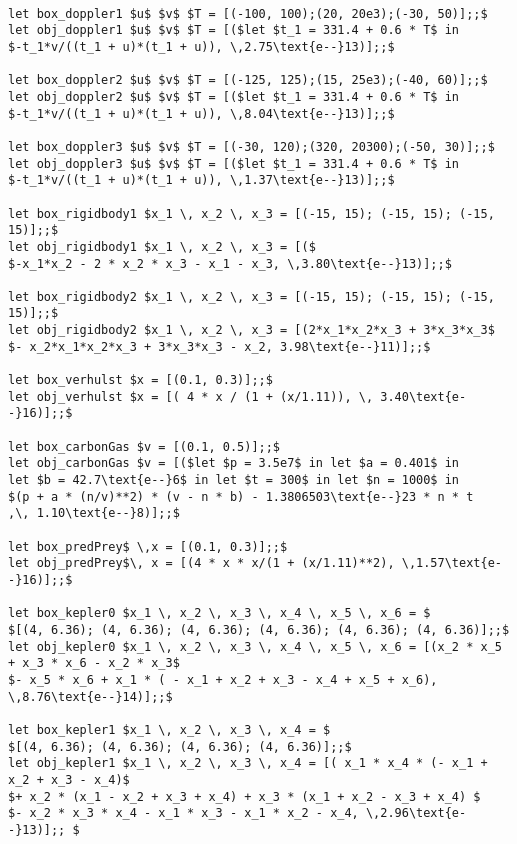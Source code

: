 {\scriptsize
\begin{lstlisting}

let box_doppler1 $u$ $v$ $T = [(-100, 100);(20, 20e3);(-30, 50)];;$ 
let obj_doppler1 $u$ $v$ $T = [($let $t_1 = 331.4 + 0.6 * T$ in 
$-t_1*v/((t_1 + u)*(t_1 + u)), \,2.75\text{e--}13)];;$

let box_doppler2 $u$ $v$ $T = [(-125, 125);(15, 25e3);(-40, 60)];;$ 
let obj_doppler2 $u$ $v$ $T = [($let $t_1 = 331.4 + 0.6 * T$ in 
$-t_1*v/((t_1 + u)*(t_1 + u)), \,8.04\text{e--}13)];;$

let box_doppler3 $u$ $v$ $T = [(-30, 120);(320, 20300);(-50, 30)];;$ 
let obj_doppler3 $u$ $v$ $T = [($let $t_1 = 331.4 + 0.6 * T$ in 
$-t_1*v/((t_1 + u)*(t_1 + u)), \,1.37\text{e--}13)];;$

let box_rigidbody1 $x_1 \, x_2 \, x_3 = [(-15, 15); (-15, 15); (-15, 15)];;$
let obj_rigidbody1 $x_1 \, x_2 \, x_3 = [($
$-x_1*x_2 - 2 * x_2 * x_3 - x_1 - x_3, \,3.80\text{e--}13)];;$

let box_rigidbody2 $x_1 \, x_2 \, x_3 = [(-15, 15); (-15, 15); (-15, 15)];;$
let obj_rigidbody2 $x_1 \, x_2 \, x_3 = [(2*x_1*x_2*x_3 + 3*x_3*x_3$ 
$- x_2*x_1*x_2*x_3 + 3*x_3*x_3 - x_2, 3.98\text{e--}11)];;$

let box_verhulst $x = [(0.1, 0.3)];;$
let obj_verhulst $x = [( 4 * x / (1 + (x/1.11)), \, 3.40\text{e--}16)];;$

let box_carbonGas $v = [(0.1, 0.5)];;$
let obj_carbonGas $v = [($let $p = 3.5e7$ in let $a = 0.401$ in 
let $b = 42.7\text{e--}6$ in let $t = 300$ in let $n = 1000$ in
$(p + a * (n/v)**2) * (v - n * b) - 1.3806503\text{e--}23 * n * t
,\, 1.10\text{e--}8)];;$

let box_predPrey$ \,x = [(0.1, 0.3)];;$
let obj_predPrey$\, x = [(4 * x * x/(1 + (x/1.11)**2), \,1.57\text{e--}16)];;$

let box_kepler0 $x_1 \, x_2 \, x_3 \, x_4 \, x_5 \, x_6 = $
$[(4, 6.36); (4, 6.36); (4, 6.36); (4, 6.36); (4, 6.36); (4, 6.36)];;$
let obj_kepler0 $x_1 \, x_2 \, x_3 \, x_4 \, x_5 \, x_6 = [(x_2 * x_5 + x_3 * x_6 - x_2 * x_3$
$- x_5 * x_6 + x_1 * ( - x_1 + x_2 + x_3 - x_4 + x_5 + x_6), \,8.76\text{e--}14)];;$

let box_kepler1 $x_1 \, x_2 \, x_3 \, x_4 = $
$[(4, 6.36); (4, 6.36); (4, 6.36); (4, 6.36)];;$
let obj_kepler1 $x_1 \, x_2 \, x_3 \, x_4 = [( x_1 * x_4 * (- x_1 + x_2 + x_3 - x_4)$
$+ x_2 * (x_1 - x_2 + x_3 + x_4) + x_3 * (x_1 + x_2 - x_3 + x_4) $
$- x_2 * x_3 * x_4 - x_1 * x_3 - x_1 * x_2 - x_4, \,2.96\text{e--}13)];; $


\end{lstlisting}}
